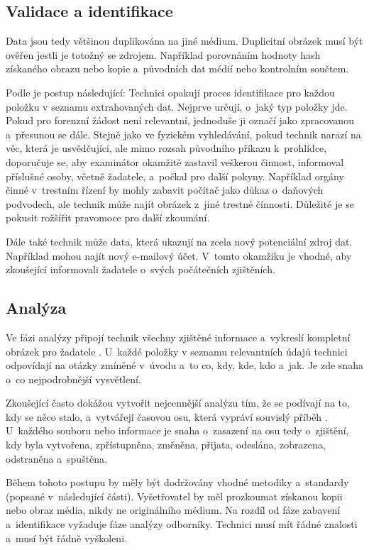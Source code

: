 \documentclass[thesis=B,czech]{FITthesis}[2012/06/26]
\begin{document}
\subsection{Validace a identifikace}

Data jsou tedy většinou duplikována na jiné médium. Duplicitní obrázek musí být ověřen jestli je totožný se zdrojem. Například porovnáním hodnoty hash získaného obrazu nebo kopie a~původních dat médií nebo kontrolním součtem.


Podle \cite{carroll2008computer} je postup následující: Technici opakují proces identifikace pro každou položku v seznamu extrahovaných dat. Nejprve určují, o~jaký typ položky jde. Pokud pro forenzní žádost není relevantní, jednoduše ji označí jako zpracovanou a~přesunou se dále. Stejně jako ve fyzickém vyhledávání, pokud technik narazí na věc, která je usvědčující, ale mimo rozsah původního příkazu k~prohlídce, doporučuje se, aby examinátor okamžitě zastavil veškerou činnost, informoval příslušné osoby, včetně žadatele, a~počkal pro další pokyny. Například orgány činné v~trestním řízení by mohly zabavit počítač jako důkaz o~daňových podvodech, ale technik může najít obrázek z~jiné trestné čínnosti. Důležité je se pokusit rožšířit pravomoce pro další zkoumání.

Dále také technik může data, která ukazují na zcela nový potenciální zdroj dat. Například mohou najít nový e-mailový účet. V~tomto okamžiku je vhodné, aby zkoušející informovali žadatele o~svých počátečních zjištěních.

\subsection{Analýza}
Ve fázi analýzy připojí technik všechny zjištěné informace a~vykreslí kompletní obrázek pro žadatele \cite{carroll2008computer}. U~každé položky v seznamu relevantních údajů technici odpovídají na otázky zmíněné v~úvodu a~to co, kdy, kde, kdo a~jak. Je zde snaha o~co nejpodrobnější vysvětlení.

Zkoušející často dokážou vytvořit nejcennější analýzu tím, že se podívají na to, kdy se něco stalo, a~vytvářejí časovou osu, která vypráví souvislý příběh \cite{carroll2008computer}. U~každého souboru nebo informace je snaha o~zasazení na osu tedy o~zjištění, kdy byla vytvořena, zpřístupněna, změněna, přijata, odeslána, zobrazena, odstraněna a~spuštěna. 

Během tohoto postupu by měly být dodržovány vhodné metodiky a~standardy (popsané v~následující části)\cite{for_sez}. Vyšetřovatel by měl prozkoumat získanou kopii nebo obraz média, nikdy ne originálního médium. Na rozdíl od fáze zabavení a~identifikace vyžaduje fáze analýzy odborníky. Technici musí mít řádné znalosti a~musí být řádně vyškoleni. 
\end{document}
